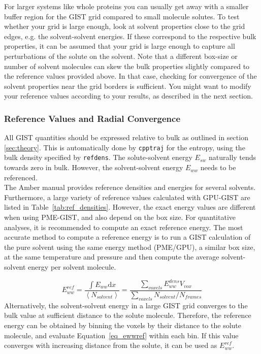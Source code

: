 \documentclass[9pt,tutorial]{livecoms}
\newcommand{\software}{\texttt}
\newcommand\inlinecode{\texttt}
\begin{document}
For larger systems like whole proteins you can usually get away with a smaller buffer region for the GIST grid compared to small molecule solutes.
To test whether your grid is large enough, look at solvent properties close to the grid edges, e.g. the solvent-solvent energies.
If these correspond to the respective bulk properties, it can be assumed that your grid is large enough to capture all perturbations of the solute on the solvent.
Note that a different box-size or number of solvent molecules can skew the bulk properties slightly compared to the reference values provided above.
In that case, checking for convergence of the solvent properties near the grid borders is sufficient. You might want to modify your reference values according to your results, as described in the next section.

\subsubsection{Reference Values and Radial Convergence}
All GIST quantities should be expressed relative to bulk as outlined in section \ref{sec:theory}.
This is automatically done by \software{cpptraj} for the entropy, using the bulk density specified by \inlinecode{refdens}.
The solute-solvent energy $E_{sw}$ naturally tends towards zero in bulk.
However, the solvent-solvent energy $E_{ww}$ needs to be referenced.\\
The Amber manual provides reference densities and energies for several solvents.
Furthermore, a large variety of reference values calculated with GPU-GIST are listed in Table~\ref{tab:ref_densities}. 
However, the exact energy values are different when using PME-GIST, and also depend on the box size.
For quantitative analyses, it is recommended to compute an exact reference energy.
The most accurate method to compute a reference energy is to run a GIST calculation of the pure solvent using the same energy method (PME/GPU), a similar box size, at the same temperature and pressure and then compute the average solvent-solvent energy per solvent molecule.

\begin{equation}
\label{eq_ewwref}
E_{ww}^\textit{ref} = \frac{\int{E_{ww}} \mathrm{d}x}{\left<N_\textit{solvent}\right>}
  = \frac{\sum_\textit{voxels}E_{ww}^\textit{dens} V_\textit{vox}}{\sum_\textit{voxels}{N_\textit{solvent}} / N_\textit{frames}}
\end{equation}
Alternatively, the solvent-solvent energy in a large GIST grid converges to the bulk value at sufficient distance to the solute molecule. 
Therefore, the reference energy can be obtained by binning the voxels by their distance to the solute molecule, and evaluate Equation~\ref{eq_ewwref} within each bin.
If this value converges with increasing distance from the solute, it can be used as $E_{ww}^\textit{ref}$.
\end{document}
